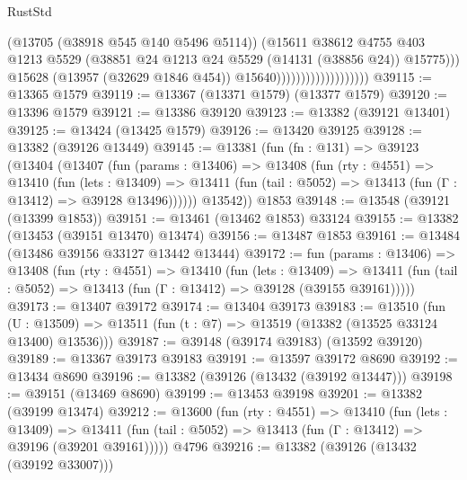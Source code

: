 \begin{lexlean}{RustStd}
\begin{coremodule}
                                            (@13705 (@38918 @545 @140 @5496 @5114))
                                            (@15611
                                              @38612
                                              @4755
                                              @403
                                              @1213
                                              @5529
                                              (@38851
                                                @24
                                                @1213
                                                @24
                                                @5529
                                                (@14131 (@38856 @24))
                                                @15775)))
                                          @15628
                                          (@13957 (@32629 @1846 @454))
                                          @15640)))))))))))))))))))
@39115 := @13365 @1579
@39119 := @13367 (@13371 @1579) (@13377 @1579)
@39120 := @13396 @1579
@39121 := @13386 @39120
@39123 := @13382 (@39121 @13401)
@39125 := @13424 (@13425 @1579)
@39126 := @13420 @39125
@39128 := @13382 (@39126 @13449)
@39145 := @13381
    (fun (fn : @131) =>
    @39123
      (@13404
        (@13407
          (fun (params : @13406) =>
          @13408
            (fun (rty : @4551) =>
            @13410
              (fun (lets : @13409) =>
              @13411 (fun (tail : @5052) => @13413 (fun (Γ : @13412) => @39128 @13496))))))
        @13542))
    @1853
@39148 := @13548 (@39121 (@13399 @1853))
@39151 := @13461 (@13462 @1853) @33124
@39155 := @13382 (@13453 (@39151 @13470) @13474)
@39156 := @13487 @1853
@39161 := @13484 (@13486 @39156 @33127 @13442 @13444)
@39172 := fun (params : @13406) =>
  @13408
    (fun (rty : @4551) =>
    @13410
      (fun (lets : @13409) =>
      @13411 (fun (tail : @5052) => @13413 (fun (Γ : @13412) => @39128 (@39155 @39161)))))
@39173 := @13407 @39172
@39174 := @13404 @39173
@39183 := @13510
    (fun (U : @13509) => @13511 (fun (t : @7) => @13519 (@13382 (@13525 @33124 @13400) @13536)))
@39187 := @39148 (@39174 @39183) (@13592 @39120)
@39189 := @13367 @39173 @39183
@39191 := @13597 @39172 @8690
@39192 := @13434 @8690
@39196 := @13382 (@39126 (@13432 (@39192 @13447)))
@39198 := @39151 (@13469 @8690)
@39199 := @13453 @39198
@39201 := @13382 (@39199 @13474)
@39212 := @13600
    (fun (rty : @4551) =>
    @13410
      (fun (lets : @13409) =>
      @13411 (fun (tail : @5052) => @13413 (fun (Γ : @13412) => @39196 (@39201 @39161)))))
    @4796
@39216 := @13382 (@39126 (@13432 (@39192 @33007)))

\end{coremodule}
\end{lexlean}
